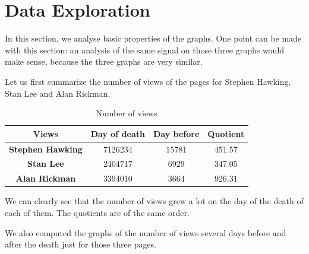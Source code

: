 \documentclass[conference]{IEEEtran}
\begin{document}
\section{Data Exploration} \label{exploration}

In this section, we analyse basic properties of the graphs.  One point can be made with this section: an analysis of the same signal on those three graphs would make sense, because the three graphs are very similar. 

\medskip

Let us first summarize the number of views of the pages for Stephen Hawking, Stan Lee and Alan Rickman. 

\begin{table}[htbp]
\caption{Number of views}
\begin{center}
\begin{tabular}{|c|c|c|c|}
\hline
 Views & Day of death &Day before & Quotient \\
\hline
\textbf{Stephen Hawking} & 7126234 & 15781 &  451.57 \\
\hline
 \textbf{Stan Lee} &2404717 & 6929 &  347.05 \\
\hline
\textbf{Alan Rickman} & 3394010 & 3664 & 926.31 \\
\hline
\end{tabular}
\end{center}
\end{table}

We can clearly see that the number of views grew a lot on the day of the death of each of them. The quotients are of the same order.

\medskip

We also computed the graphs of the number of views several days before and after the death just for those three pages. 
\end{document}
